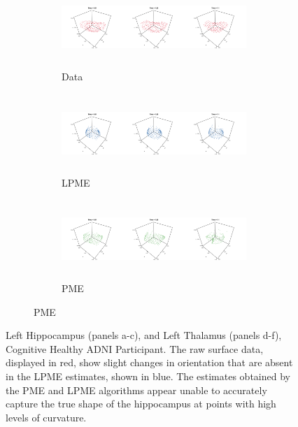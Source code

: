 \documentclass[12pt]{article}
\begin{document}
\begin{figure}
  \begin{subfigure}{\textwidth}
    \label{fig:adni_lthal_result}
    \begin{subfigure}{\textwidth}
      \centering
      \includegraphics[height=3cm]{adni_lthal_data_plot}
      \caption{Data}
    \end{subfigure}
    \begin{subfigure}{\textwidth}
      \centering
      \includegraphics[height=3cm]{adni_lthal_lpme_isomap_plot}
      \caption{LPME}
    \end{subfigure}
    \begin{subfigure}{\textwidth}
      \centering
      \includegraphics[height=3cm]{adni_lthal_pme_plot}
      \caption{PME}
    \end{subfigure}
  \end{subfigure}

  \caption{Left Hippocampus (panels a-c), and Left Thalamus (panels d-f), Cognitive Healthy ADNI Participant. The raw surface data, displayed in red, show slight changes in orientation that are absent in the LPME estimates, shown in blue. The estimates obtained by the PME and LPME algorithms appear unable to accurately capture the true shape of the hippocampus at points with high levels of curvature.}
  \label{fig:adni_result}
\end{figure}
\end{document}
